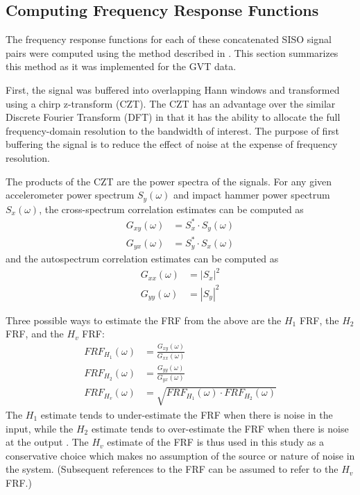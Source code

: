 \subsection{Computing Frequency Response Functions}

The frequency response functions for each of these concatenated SISO signal pairs were computed using the method described in \cite{Tischler2012}. This section summarizes this method as it was implemented for the GVT data.

First, the signal was buffered into overlapping Hann windows and transformed using a chirp z-transform (CZT). The CZT has an advantage over the similar Discrete Fourier Transform (DFT) in that it has the ability to allocate the full frequency-domain resolution to the bandwidth of interest. The purpose of first buffering the signal is to reduce the effect of noise at the expense of frequency resolution.

The products of the CZT are the power spectra of the signals. For any given accelerometer power spectrum $S_y(\omega)$ and impact hammer power spectrum $S_x(\omega)$, the cross-spectrum correlation estimates can be computed as
\begin{align}
    G_{xy}(\omega) &= S_x^* \cdot S_y(\omega) \\
    G_{yx}(\omega) &= S_y^* \cdot S_x(\omega)
\end{align}
and the autospectrum correlation estimates can be computed as
\begin{align}
    G_{xx}(\omega) &= |S_x|^2	 \\
    G_{yy}(\omega) &= |S_y|^2
\end{align}

Three possible ways to estimate the FRF from the above are the $H_1$ FRF, the $H_2$ FRF, and the $H_v$ FRF:
\begin{align}
    FRF_{H_1}(\omega) &= \frac{G_{xy}(\omega)}{G_{xx}(\omega)} \\
    FRF_{H_2}(\omega) &= \frac{G_{yy}(\omega)}{G_{yx}(\omega)} \\
    \label{eq:frf}
    FRF_{H_v}(\omega) &= \sqrt{FRF_{H_1}(\omega) \cdot FRF_{H_2}(\omega)}
\end{align}
The $H_1$ estimate tends to under-estimate the FRF when there is noise in the input, while the $H_2$ estimate tends to over-estimate the FRF when there is noise at the output \cite{Tischler2012}. The $H_v$ estimate of the FRF is thus used in this study as a conservative choice which makes no assumption of the source or nature of noise in the system. (Subsequent references to the FRF can be assumed to refer to the $H_v$ FRF.)

